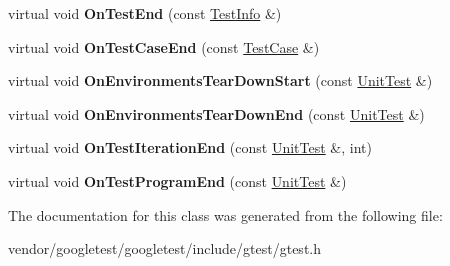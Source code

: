 \begin{DoxyCompactItemize}
\item 
\mbox{\label{classtesting_1_1_empty_test_event_listener_afd58d21005f0d0d0399fb114627545d3}} 
virtual void {\bfseries On\+Test\+End} (const \mbox{\hyperlink{classtesting_1_1_test_info}{Test\+Info}} \&)
\item 
\mbox{\label{classtesting_1_1_empty_test_event_listener_a6bec703158283104c4298f7d8a528515}} 
virtual void {\bfseries On\+Test\+Case\+End} (const \mbox{\hyperlink{classtesting_1_1_test_case}{Test\+Case}} \&)
\item 
\mbox{\label{classtesting_1_1_empty_test_event_listener_a00fa1a4ea5831e20746188414268e7c6}} 
virtual void {\bfseries On\+Environments\+Tear\+Down\+Start} (const \mbox{\hyperlink{classtesting_1_1_unit_test}{Unit\+Test}} \&)
\item 
\mbox{\label{classtesting_1_1_empty_test_event_listener_aea64c83c415b33a4c0b0239bafd1438d}} 
virtual void {\bfseries On\+Environments\+Tear\+Down\+End} (const \mbox{\hyperlink{classtesting_1_1_unit_test}{Unit\+Test}} \&)
\item 
\mbox{\label{classtesting_1_1_empty_test_event_listener_a2253e5a18b3cf7bccd349567a252209d}} 
virtual void {\bfseries On\+Test\+Iteration\+End} (const \mbox{\hyperlink{classtesting_1_1_unit_test}{Unit\+Test}} \&, int)
\item 
\mbox{\label{classtesting_1_1_empty_test_event_listener_a0abcc02bd2331a2e29ad6f4d9daf2a32}} 
virtual void {\bfseries On\+Test\+Program\+End} (const \mbox{\hyperlink{classtesting_1_1_unit_test}{Unit\+Test}} \&)
\end{DoxyCompactItemize}


The documentation for this class was generated from the following file\+:\begin{DoxyCompactItemize}
\item 
vendor/googletest/googletest/include/gtest/gtest.\+h\end{DoxyCompactItemize}
